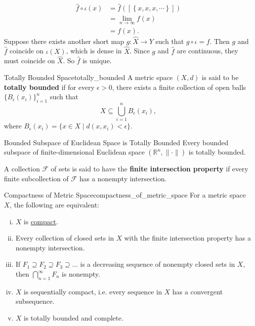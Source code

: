 \documentclass{report}
\begin{document}
\begin{prf}
\begin{itemize}
	\begin{align*}
		\hat{f}\circ\iota(x)&=\hat{f}\left([\left\{x,x,x,\cdots\right\}]\right)\\
		&=\lim_{n\to\infty}f(x)\\
		&=f(x).
	\end{align*}
	Suppose there exists another short map $g:\widehat{X}\to Y$ such that $g\circ\iota=f$. Then $g$ and $\hat{f}$ coincide on $\iota(X)$, which is dense in $\widehat{X}$. Since $g$ and $\hat{f}$ are continuous, they must coincide on $\widehat{X}$. So $\hat{f}$ is unique.
	\end{itemize}
\end{prf}

\begin{definition}{Totally Bounded Space}{totally_bounded}
	A metric space $(X,d)$ is said to be \textbf{totally bounded} if for every $\epsilon>0$, there exists a finite collection of open balls $\{B_\epsilon(x_i)\}_{i=1}^n$ such that
	\[
		X\subseteq\bigcup_{i=1}^n B_\epsilon(x_i),
	\]
	where $B_\epsilon(x_i)=\{x\in X\mid d(x,x_i)<\epsilon\}$.
\end{definition}

\begin{proposition}{Bounded Subspace of Euclidean Space is Totally Bounded}{}
	Every bounded subspace of finite-dimensional Euclidean space $\left(\mathbb{R}^n,\|\cdot\|\right)$ is totally bounded.
\end{proposition}

A collection $\mathcal{F}$ of sets is said to have the \textbf{finite intersection property} if every finite subcollection of $\mathcal{F}$ has a nonempty intersection.
\begin{proposition}{Compactness of Metric Space}{compactness_of_metric_space}
	For a metric space $X$, the following are equivalent:
	\begin{enumerate}[(i)]
		\item $X$ is \hyperref[th:compact_topological_space]{compact}.
		\item Every collection of closed sets in $X$ with the finite intersection property has a nonempty intersection.
		\item If $F_1 \supseteq F_2 \supseteq F_3 \supseteq \ldots$ is a decreasing sequence of nonempty closed sets in $X$, then $\bigcap_{n=1}^{\infty} F_n$ is nonempty.
		\item $X$ is sequentially compact, i.e. every sequence in $X$ has a convergent subsequence.
		\item $X$ is totally bounded and complete.
	\end{enumerate}
\end{proposition}
\end{document}
